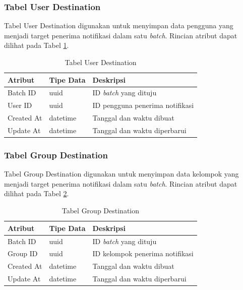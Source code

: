 \subsubsection{Tabel User Destination}
\par Tabel User Destination digunakan untuk menyimpan data pengguna yang menjadi target penerima notifikasi dalam satu \textit{batch}. Rincian atribut dapat dilihat pada Tabel \ref{tabel_user_destination}.
\begin{longtable}{|p{2cm}|p{2.5cm}|p{4.5cm}|}
	\caption{Tabel User Destination} \label{tabel_user_destination} \\ \hline
    \rowcolor{lightgray} {Atribut} & {Tipe Data} & {Deskripsi} \\ \hline
    \endhead
    Batch ID & uuid & ID \textit{batch} yang dituju \\ \hline
    User ID & uuid & ID pengguna penerima notifikasi \\ \hline
    Created At & datetime & Tanggal dan waktu dibuat \\ \hline
    Update At & datetime & Tanggal dan waktu diperbarui \\ \hline
\end{longtable}

\subsubsection{Tabel Group Destination}
\par Tabel Group Destination digunakan untuk menyimpan data kelompok yang menjadi target penerima notifikasi dalam satu \textit{batch}. Rincian atribut dapat dilihat pada Tabel \ref{tabel_group_destination}.
\begin{longtable}{|p{2cm}|p{2.5cm}|p{4.5cm}|}
	\caption{Tabel Group Destination} \label{tabel_group_destination} \\ \hline
    \rowcolor{lightgray} {Atribut} & {Tipe Data} & {Deskripsi} \\ \hline
    \endhead
    Batch ID & uuid & ID \textit{batch} yang dituju \\ \hline
    Group ID & uuid & ID kelompok penerima notifikasi \\ \hline
    Created At & datetime & Tanggal dan waktu dibuat \\ \hline
    Update At & datetime & Tanggal dan waktu diperbarui \\ \hline
\end{longtable}

